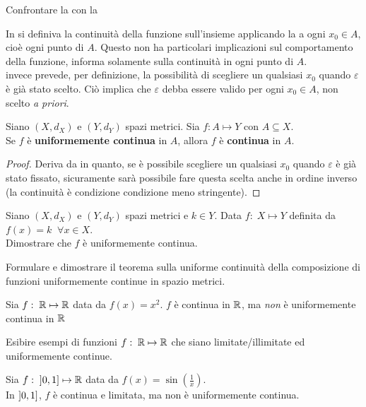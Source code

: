 \begin{exercise}
	\label{ex:cont_unif_cont_comparision}
	Confrontare la  con la 
	\begin{solution}
		In  si definiva la continuità della funzione sull'insieme applicando la  a ogni $x_0 \in A$, cioè ogni punto di $A$. Questo non ha particolari implicazioni sul comportamento della funzione, informa solamente sulla continuità in ogni punto di $A$.\\
		 invece prevede, per definizione, la possibilità di scegliere un qualsiasi $x_0$ quando $\varepsilon$ è già stato scelto. Ciò implica che $\varepsilon$ debba essere valido per ogni $x_0 \in A$, non scelto \textit{a priori}.
	\end{solution}
\end{exercise}
\begin{proposition}
	\label{prop:if_unif_cont_then_conf}
	Siano $(X,d_X)$ e $(Y,d_Y)$ spazi metrici. Sia $f:A \mapsto Y$ con $A \subseteq X$.\\
	Se $f$ è \textbf{uniformemente continua} in $A$, allora $f$ è \textbf{continua} in $A$.
	\begin{proof}
		Deriva da  in quanto, se è possibile scegliere un qualsiasi $x_0$ quando $\varepsilon$ è già stato fissato, sicuramente sarà possibile fare questa scelta anche in ordine inverso (la continuità è condizione condizione meno stringente).
	\end{proof}
\end{proposition}
\begin{exercise}
	Siano $(X,d_X)$ e $(Y,d_Y)$ spazi metrici e $k \in Y$. Data $f:\; X \mapsto Y$ definita da $f(x) = k\;\; \forall x \in X$.\\
	Dimostrare che $f$ è uniformemente continua.
\end{exercise}
\begin{exercise}
	Formulare e dimostrare il teorema sulla uniforme continuità della composizione di funzioni uniformemente continue in spazio metrici.
\end{exercise}
\begin{example}
	Sia $f:\; \mathbb{R} \mapsto \mathbb{R}$ data da $f(x) = x^2$. $f$ è continua in $\mathbb{R}$, ma \textit{non} è uniformemente continua in $\mathbb{R}$
\end{example}
\begin{exercise}
	Esibire esempi di funzioni $f:\; \mathbb{R} \mapsto \mathbb{R}$ che siano limitate/illimitate ed uniformemente continue.
\end{exercise}
\begin{example}
	Sia $f:\; \left]0,1\right] \mapsto \mathbb{R}$ data da $f(x) = \sin(\frac{1}{x})$.\\
	In $\left]0,1\right]$, $f$ è continua e limitata, ma non è uniformemente continua.
\end{example}

